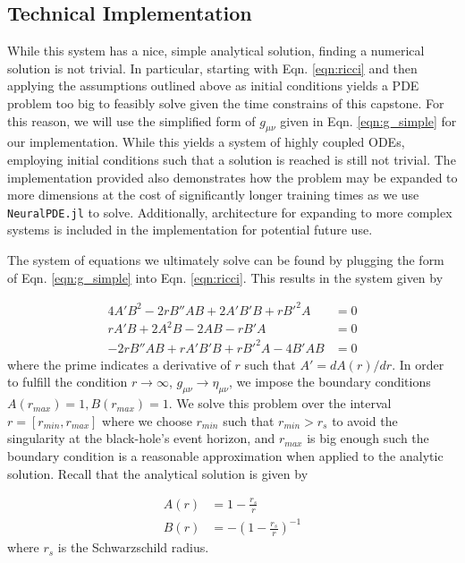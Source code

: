 \documentclass{CUP-JNL-DTM}%
\theoremstyle{definition}
\numberwithin{equation}{section}
\begin{document}
\subsection{Technical Implementation}

While this system has a nice, simple analytical solution, finding a numerical solution is not trivial. In particular, starting with Eqn. \ref{eqn:ricci} and then applying the assumptions outlined above as initial conditions yields a PDE problem too big to feasibly solve given the time constrains of this capstone. For this reason, we will use the simplified form of $g_{\mu\nu}$ given in Eqn. \ref{eqn:g_simple} for our implementation. While this yields a system of highly coupled ODEs, employing initial conditions such that a solution is reached is still not trivial. The implementation provided also demonstrates how the problem may be expanded to more dimensions at the cost of significantly longer training times as we use \texttt{NeuralPDE.jl} to solve. Additionally, architecture for expanding to more complex systems is included in the implementation for potential future use. 

The system of equations we ultimately solve can be found by plugging the form of Eqn. \ref{eqn:g_simple} into Eqn. \ref{eqn:ricci}. This results in the system given by 

\begin{equation}
\begin{split}
    4A'B^2 - 2rB''AB + 2A'B'B + rB'^2A & = 0 \\
    rA'B + 2A^2B - 2AB - rB'A & = 0 \\ 
    -2rB''AB + rA'B'B + rB'^2A - 4B'AB & = 0
    \label{eqn:einstein_ODEs}
\end{split}
\end{equation}
where the prime indicates a derivative of $r$ such that $A' = dA(r)/dr$. In order to fulfill the condition $r \rightarrow \infty$, $g_{\mu\nu} \rightarrow \eta_{\mu\nu}$, we impose the boundary conditions $A(r_{max}) = 1, B(r_{max}) = 1$. We solve this problem over the interval $r = [r_{min}, r_{max}]$ where we choose $r_{min}$ such that $r_{min} > r_s$ to avoid the singularity at the black-hole's event horizon, and $r_{max}$ is big enough such the boundary condition is a reasonable approximation when applied to the analytic solution. Recall that the analytical solution is given by 

\begin{equation}
\begin{split}
    A(r) & = 1 - \frac{r_s}{r} \\ 
    B(r) & = -\left(1 - \frac{r_s}{r}\right)^{-1}
\end{split}
\end{equation}
where $r_s$ is the Schwarzschild radius. 
\end{document}
